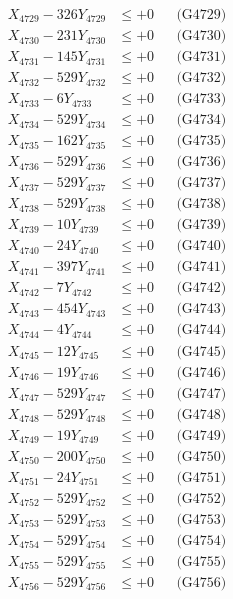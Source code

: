 \documentclass[a4paper,10pt]{article}
\begin{document}
{\begin{align}
X_{4729} - 326Y_{4729} &\leq +0 && \text{(G4729)} \\
X_{4730} - 231Y_{4730} &\leq +0 && \text{(G4730)} \\
\allowbreak
X_{4731} - 145Y_{4731} &\leq +0 && \text{(G4731)} \\
X_{4732} - 529Y_{4732} &\leq +0 && \text{(G4732)} \\
X_{4733} - 6Y_{4733} &\leq +0 && \text{(G4733)} \\
X_{4734} - 529Y_{4734} &\leq +0 && \text{(G4734)} \\
X_{4735} - 162Y_{4735} &\leq +0 && \text{(G4735)} \\
X_{4736} - 529Y_{4736} &\leq +0 && \text{(G4736)} \\
X_{4737} - 529Y_{4737} &\leq +0 && \text{(G4737)} \\
X_{4738} - 529Y_{4738} &\leq +0 && \text{(G4738)} \\
X_{4739} - 10Y_{4739} &\leq +0 && \text{(G4739)} \\
X_{4740} - 24Y_{4740} &\leq +0 && \text{(G4740)} \\
\allowbreak
X_{4741} - 397Y_{4741} &\leq +0 && \text{(G4741)} \\
X_{4742} - 7Y_{4742} &\leq +0 && \text{(G4742)} \\
X_{4743} - 454Y_{4743} &\leq +0 && \text{(G4743)} \\
X_{4744} - 4Y_{4744} &\leq +0 && \text{(G4744)} \\
X_{4745} - 12Y_{4745} &\leq +0 && \text{(G4745)} \\
X_{4746} - 19Y_{4746} &\leq +0 && \text{(G4746)} \\
X_{4747} - 529Y_{4747} &\leq +0 && \text{(G4747)} \\
X_{4748} - 529Y_{4748} &\leq +0 && \text{(G4748)} \\
X_{4749} - 19Y_{4749} &\leq +0 && \text{(G4749)} \\
X_{4750} - 200Y_{4750} &\leq +0 && \text{(G4750)} \\
\allowbreak
X_{4751} - 24Y_{4751} &\leq +0 && \text{(G4751)} \\
X_{4752} - 529Y_{4752} &\leq +0 && \text{(G4752)} \\
X_{4753} - 529Y_{4753} &\leq +0 && \text{(G4753)} \\
X_{4754} - 529Y_{4754} &\leq +0 && \text{(G4754)} \\
X_{4755} - 529Y_{4755} &\leq +0 && \text{(G4755)} \\
X_{4756} - 529Y_{4756} &\leq +0 && \text{(G4756)} \\

\end{align}}
\end{document}
